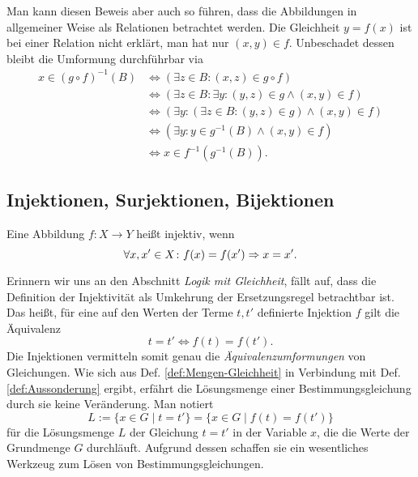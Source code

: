 \noindent
Man kann diesen Beweis aber auch so führen, dass die Abbildungen in
allgemeiner Weise als Relationen betrachtet werden. Die Gleichheit
$y=f(x)$ ist bei einer Relation nicht erklärt, man hat nur $(x,y)\in f$.
Unbeschadet dessen bleibt die Umformung durchführbar via
\begin{align*}
x\in (g\circ f)^{-1}(B)
&\iff (\exists z\in B\colon (x,z)\in g\circ f)\\
&\iff (\exists z\in B\colon\exists y\colon (y,z)\in g \land (x,y)\in f)\\
&\iff (\exists y\colon (\exists z\in B\colon (y,z)\in g) \land (x,y)\in f)\\
&\iff (\exists y\colon y\in g^{-1}(B)\land (x,y)\in f)\\
&\iff x\in f^{-1}(g^{-1}(B)).
\end{align*}

\subsection{Injektionen, Surjektionen, Bijektionen}

\begin{Definition}[Injektion]\label{def:injektiv}\newlinefirst
Eine Abbildung $f\colon X\to Y$ heißt injektiv, wenn%
\[\forall x,x'\in X\colon f(x)=f(x')\Rightarrow x=x'.\]
\end{Definition}

\noindent
Erinnern wir uns an den Abschnitt \emph{Logik mit Gleichheit}, fällt
auf, dass die Definition der Injektivität als Umkehrung der
Ersetzungsregel betrachtbar ist. Das heißt, für eine auf den Werten
der Terme $t,t'$ definierte Injektion $f$ gilt die Äquivalenz%
\[t=t' \iff f(t)=f(t').\]
Die Injektionen vermitteln somit genau die \emph{Äquivalenzumformungen}%
 von Gleichungen.
Wie sich aus Def. \ref{def:Mengen-Gleichheit} in Verbindung mit
Def. \ref{def:Aussonderung} ergibt, erfährt die Lösungsmenge einer
Bestimmungsgleichung durch sie keine Veränderung. Man notiert%
\[L := \{x\in G\mid t=t'\} = \{x\in G\mid f(t)=f(t')\}\]
für die Lösungsmenge $L$ der Gleichung $t=t'$ in der Variable $x$,
die die Werte der Grundmenge $G$ durchläuft. Aufgrund dessen schaffen
sie ein wesentliches Werkzeug zum Lösen von Bestimmungsgleichungen.

